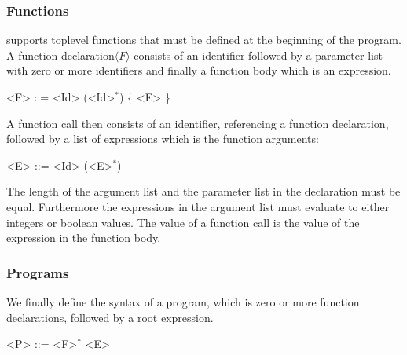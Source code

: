 \subsubsection{Functions}
\explanguage supports toplevel functions that must be defined at the beginning of the program. A function declaration$\langle F \rangle$ consists of an identifier followed by a parameter list with zero or more identifiers and finally a function body which is an expression.

\begin{grammar}
	<F> ::= <Id> (<Id>$^{*}$) \{ <E> \}
\end{grammar}

A function call then consists of an identifier, referencing a function declaration, followed by a list of expressions which is the function arguments:

\begin{grammar}
	<E> ::= <Id> (<E>$^{*}$) 
\end{grammar}

The length of the argument list and the parameter list in the declaration must be equal. Furthermore the expressions in the argument list must evaluate to either integers or  boolean values.
The value of a function call is the value of the expression in the function body.


\subsubsection{Programs}
We finally define the syntax of a \explanguage program, which is zero or more function declarations, followed by a root expression. 

\begin{grammar}
	<P> ::= <F>$^{*}$ <E>
\end{grammar}









	